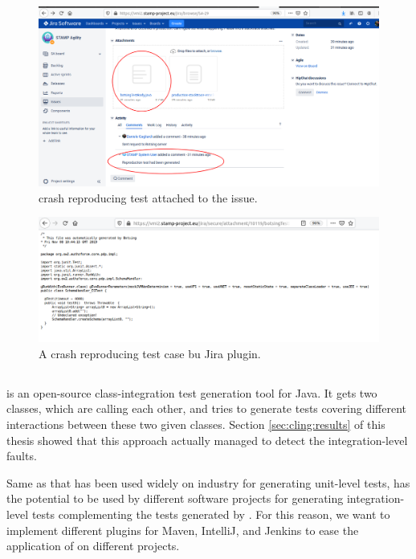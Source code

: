 \begin{figure}
    \includegraphics[width=\textwidth]{conclusion/figures/deliverables_wp4_d44_images_jira-reproduction-done.png}
    \caption{crash reproducing test attached to the issue.}
    \label{fig:conclusion:botsingJira3}
\end{figure}


\begin{figure}
    \includegraphics[width=\textwidth]{conclusion/figures/deliverables_wp4_d44_images_jira-generated-test-case.png}
    \caption{A crash reproducing test case bu \botsing Jira plugin.}
    \label{fig:conclusion:botsingJira4}
\end{figure}


\subsection{\cling}

\cling is an open-source class-integration test generation tool for Java. It gets two classes, which are calling each other, and tries to generate tests covering different interactions between these two given classes. Section \ref{sec:cling:results} of this thesis showed that this approach actually managed to detect the integration-level faults. 

Same as \evosuite that has been used widely on industry \cite{} for generating unit-level tests, \cling has the potential to be used by different software projects for generating integration-level tests complementing the tests generated by \evosuite. For this reason, we want to implement different plugins for Maven, IntelliJ, and Jenkins to ease the application of \cling on different projects.


